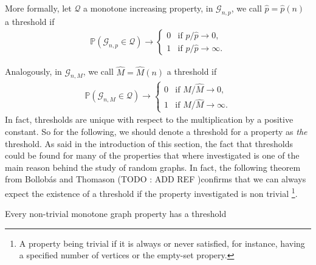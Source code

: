More formally, let $\mathcal{Q}$ a monotone increasing property,  in $\mathcal{G}_{n, p}$, we call $\hat{p} = \hat{p}(n)$ a threshold if
\begin{align}
	\mathbb{P}(\mathcal{G}_{n,p} \in \mathcal{Q}) \rightarrow \left\{\begin{array}{rl}
										0 & \text{if } p / \hat{p} \to 0,\\
										1 & \text{if } p / \hat{p} \to \infty.
									 \end{array}
									\right.
\end{align}

Analogously, in $\mathcal{G}_{n, M}$, we call $\hat{M} = \hat{M}(n)$ a threshold if
\begin{align}
	\mathbb{P}(\mathcal{G}_{n,M} \in \mathcal{Q}) \rightarrow \left\{\begin{array}{rl}
										0 & \text{if } M / \hat{M} \to 0,\\
										1 & \text{if } M / \hat{M} \to \infty.
									 \end{array}
									\right.
\end{align}
In fact, thresholds are unique with respect to the multiplication by a positive constant. So for the following, we should denote a threshold for a property as \emph{the} threshold.
\newline
As said in the introduction of this section, the fact that thresholds could be found for many of the properties that where investigated is one of the main reason behind the study of random graphs.
In fact, the following theorem from Bollob\'as and Thomason (TODO : ADD REF )confirms that we can always expect the existence of a threshold if the property investigated is non trivial
\footnote{A property being trivial if it is always or never satisfied, for instance, having a specified number of vertices or the empty-set propery.}.
\begin{theorem}
	Every non-trivial monotone graph property has a threshold
\end{theorem}
